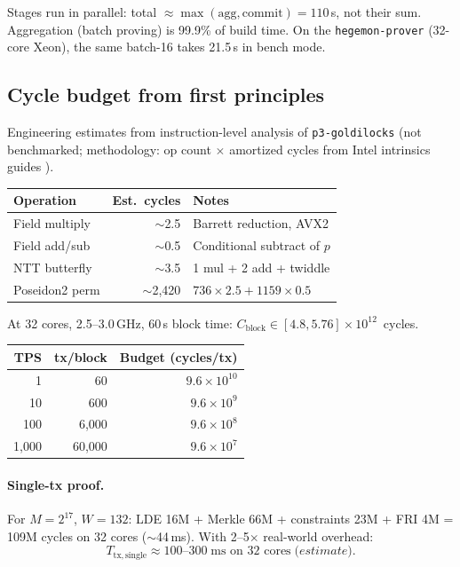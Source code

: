 \documentclass[11pt]{article}
\begin{document}
Stages run in parallel: total $\approx \max(\text{agg}, \text{commit}) = 110$\,s,
not their sum. Aggregation (batch proving) is 99.9\% of build time. On the
\texttt{hegemon-prover} (32-core Xeon), the same batch-16 takes 21.5\,s in
bench mode.

\subsection{Cycle budget from first principles}

Engineering estimates from instruction-level analysis of \texttt{p3-goldilocks}
(not benchmarked; methodology: op count $\times$ amortized cycles from Intel
intrinsics guides \cite{plonky3recbook}).

\begin{center}
\begin{tabular}{@{}lrl@{}}
\toprule
\textbf{Operation} & \textbf{Est.\ cycles} & \textbf{Notes} \\
\midrule
Field multiply & $\sim$2.5 & Barrett reduction, AVX2 \\
Field add/sub & $\sim$0.5 & Conditional subtract of $p$ \\
NTT butterfly & $\sim$3.5 & 1 mul + 2 add + twiddle \\
Poseidon2 perm & $\sim$2{,}420 & $736 \times 2.5 + 1159 \times 0.5$ \\
\bottomrule
\end{tabular}
\end{center}

At 32 cores, 2.5--3.0\,GHz, 60\,s block time:
$C_{\mathrm{block}} \in [4.8, 5.76] \times 10^{12}$~cycles.

\begin{center}
\begin{tabular}{@{}rrr@{}}
\toprule
\textbf{TPS} & \textbf{tx/block} & \textbf{Budget (cycles/tx)} \\
\midrule
1 & 60 & $9.6 \times 10^{10}$ \\
10 & 600 & $9.6 \times 10^{9}$ \\
100 & 6{,}000 & $9.6 \times 10^{8}$ \\
1{,}000 & 60{,}000 & $9.6 \times 10^{7}$ \\
\bottomrule
\end{tabular}
\end{center}

\paragraph{Single-tx proof.}
For $M = 2^{17}$, $W = 132$: LDE 16M + Merkle 66M + constraints 23M +
FRI 4M = 109M cycles on 32 cores ($\sim$44\,ms). With 2--5$\times$
real-world overhead:
\begin{equation}
\boxed{T_{\mathrm{tx,single}} \approx 100\text{--}300\;\text{ms on 32 cores}
\;\textit{(estimate).}}
\end{equation}
\end{document}
